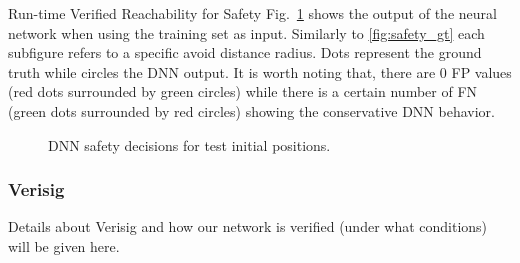 \begin{section}{Run-time Verified Reachability for Safety}
Fig.~\ref{fig:output_test} shows the output of the neural network when using the training set as input. Similarly to \ref{fig:safety_gt} each subfigure refers to a specific avoid distance radius. Dots represent the ground truth while circles the DNN output.
It is worth noting that, there are 0 FP values (red dots surrounded by green circles) while there is a certain number of FN (green dots surrounded by red circles) showing the conservative DNN behavior.
\begin{figure}[H]
	\centering
	\label{fig:output_test}
	\caption{DNN safety decisions for test initial positions.}
\end{figure}

\subsubsection{Verisig}
Details about Verisig and how our network is verified (under what conditions) will be given here. 

\end{section}
 